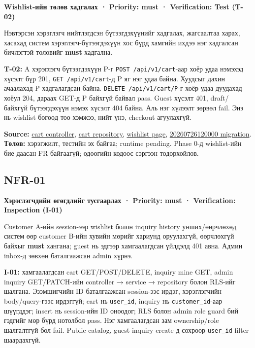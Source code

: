 \documentclass[
  11pt,
  a4paper,
]{article}
\begin{document}
\textbf{Wishlist-ийн төлөв хадгалах · Priority: must · Verification:
Test (T-02)}

Нэвтэрсэн хэрэглэгч нийтлэгдсэн бүтээгдэхүүнийг хадгалах, жагсаалтаа
харах, хасахад систем хэрэглэгч-бүтээгдэхүүн хос бүрд хамгийн ихдээ нэг
хадгалсан бичлэгтэй төлөвийг \textbf{must} хадгална.

\textbf{T-02:} A хэрэглэгч бүтээгдэхүүн P-г
\nolinkurl{POST /api/v1/cart}-аар хоёр удаа нэмэхэд хүсэлт бүр 201,
\nolinkurl{GET /api/v1/cart}-д P яг нэг удаа байна. Хуудсыг дахин
ачаалахад P хадгалагдсан байна. \nolinkurl{DELETE /api/v1/cart/P}-г хоёр
удаа дуудахад хоёул 204, дараах GET-д P байхгүй байвал pass. Guest
хүсэлт 401, draft/байхгүй бүтээгдэхүүн нэмэх хүсэлт 404 байна. Аль нэг
хүлээлт зөрвөл fail. Энэ нь wishlist бөгөөд тоо хэмжээ, нийт үнэ,
checkout агуулахгүй.

\textbf{Source:}
\href{../../../backend/api/src/controllers/cart.controller.ts}{cart
controller},
\href{../../../backend/api/src/repositories/supabase/cart.repository.ts}{cart
repository}, \href{../../../apps/web/src/app/wishlist/page.tsx}{wishlist
page},
\href{../../../supabase/migrations/20260726120000_inquiry_customer_and_cart.sql}{20260726120000
migration}. \textbf{Төлөв:} хэрэгжилт, тестийн эх байгаа; runtime
pending. Phase 0-д wishlist-ийн бие даасан FR байгаагүй; одоогийн кодоос
сэргээн тодорхойлов.

\subsection{NFR-01}\label{doc4-nfr-01}

\textbf{Хэрэглэгчдийн өгөгдлийг тусгаарлах · Priority: must ·
Verification: Inspection (I-01)}

Customer A-ийн session-ээр wishlist болон inquiry history
унших/өөрчлөхөд систем өөр customer B-ийн хувийн мөрийг хариунд
оруулахгүй, өөрчлөхгүй байхыг \textbf{must} хангана; guest нь эдгээр
хамгаалагдсан үйлдэлд 401 авна. Админ inbox-д зөвхөн баталгаажсан admin
хүрнэ.

\textbf{I-01:} хамгаалагдсан cart GET/POST/DELETE, inquiry mine GET,
admin inquiry GET/PATCH-ийн controller → service → repository болон
RLS-ийг шалгана. Эзэмшигчийн ID баталгаажсан session-ээс ирдэг,
хэрэглэгчийн body/query-гээс ирдэггүй; cart нь \nolinkurl{user_id},
inquiry нь \nolinkurl{customer_id}-аар шүүгддэг; insert нь session-ийн
ID оноодог; RLS болон admin role guard бий гэдгийг мөр бүрд нотолбол
pass. Нэг хамгаалагдсан зам ownership/role шалгалтгүй бол fail. Public
catalog, guest inquiry create-д сохроор \nolinkurl{user_id} filter
шаардахгүй.
\end{document}
